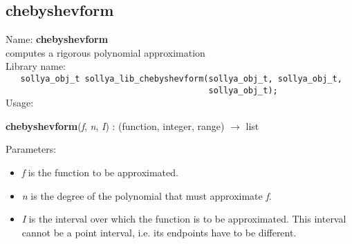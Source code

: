 \subsection{chebyshevform}
\label{labchebyshevform}
\noindent Name: \textbf{chebyshevform}\\
\phantom{aaa}computes a rigorous polynomial approximation \\[0.2cm]
\noindent Library name:\\
\verb|   sollya_obj_t sollya_lib_chebyshevform(sollya_obj_t, sollya_obj_t, |\\
\verb|                                         sollya_obj_t); |\\[0.2cm]
\noindent Usage: 
\begin{center}
\textbf{chebyshevform}(\emph{f}, \emph{n}, \emph{I}) : (\textsf{function}, \textsf{integer}, \textsf{range}) $\rightarrow$ \textsf{list}\\
\end{center}
Parameters: 
\begin{itemize}
\item \emph{f} is the function to be approximated.
\item \emph{n} is the degree of the polynomial that must approximate \emph{f}.
\item \emph{I} is the interval over which the function is to be approximated. This interval cannot be a point interval, i.e. its endpoints have to be different.
\end{itemize}
